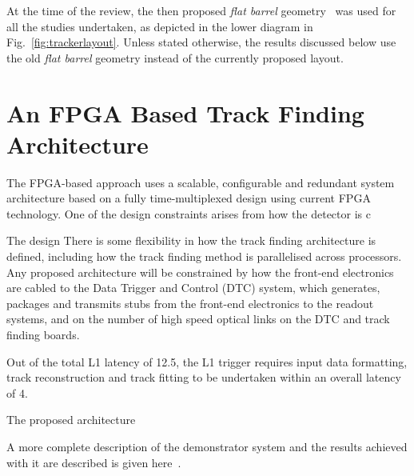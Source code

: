 At the time of the review, the then proposed \emph{flat barrel} geometry~\cite{CMS_Upgrade_TP} was used for all the studies undertaken, as depicted in the lower diagram in Fig.~\ref{fig:trackerlayout}.
Unless stated otherwise, the results discussed below use the old \emph{flat barrel} geometry instead of the currently proposed layout.

\section{An FPGA Based Track Finding Architecture}

The FPGA-based \HT approach uses a scalable, configurable and redundant system architecture based on a fully time-multiplexed design using current FPGA technology.
One of the design constraints arises from how the detector is c

The design 
There is some flexibility in how the track finding architecture is defined, including how the track finding method is parallelised across processors.
Any proposed architecture will be constrained by
 how the front-end electronics are cabled to the Data Trigger and Control (DTC) system, which generates, packages and transmits stubs from the front-end electronics to the readout systems, and on the number of high speed optical links on the DTC and track finding boards.

Out of the total L1 latency of 12.5\mus, the L1 trigger requires input data formatting, track reconstruction and track fitting to be undertaken within an overall latency of 4\mus.

The proposed architecture

A more complete description of the demonstrator system and the results achieved with it are described is given here~\cite{TMTT_JINST}.

